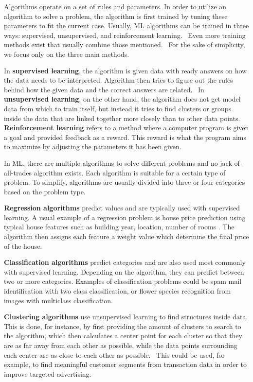 Algorithms operate on a set of rules and parameters.
In order to utilize an algorithm to solve a problem,
the algorithm is first trained by tuning these parameters
to fit the current case.
Usually,
ML algorithms can be trained in three ways:
supervised, unsupervised, and reinforcement learning.~\cite{jordan2015machine}
Even more training methods exist
that usually combine those mentioned.~\cite{ayodele2010types, mahesh2020machine}
For the sake of simplicity,
we focus only on the three main methods.

In \textbf{supervised learning},
the algorithm is given data with ready answers on
how the data needs to be interpreted.
Algorithm then tries to figure out the rules behind
how the given data and the correct answers are related.~\cite{ayodele2010types}
In \textbf{unsupervised learning},
on the other hand,
the algorithm does not get model data from which to train itself,
but instead it tries to find clusters or groups inside the data
that are linked together more closely than to other data points.~\cite{winky}
\textbf{Reinforcement learning} refers to a method
where a computer program is given a goal
and provided feedback as a reward.
This reward is what the program aims to maximize
by adjusting the parameters it has been given.~\cite{ayodele2010types}

In ML,
there are multiple algorithms to solve different problems
and no jack-of-all-trades algorithm exists.
Each algorithm is suitable for a certain type of problem.
To simplify,
algorithms are usually divided into three or four categories
based on the problem type.~\cite{vickery2019mltypes}

\textbf{Regression algorithms} predict values
and are typically used with supervised learning.
A usual example of a regression problem
is house price prediction
using typical house features
such as building
year, location, number of rooms \etc.
The algorithm then assigns each feature a weight value
which determine the final price of the house.~\cite{vickery2019mltypes}

\textbf{Classification algorithms} predict categories
and are also used most commonly with supervised learning.
Depending on the algorithm,
they can predict between two or more categories.
Examples of classification problems
could be spam mail identification with two class classification,
or flower species recognition from images with multiclass classification.~\cite{vickery2019mltypes}

\textbf{Clustering algorithms} use unsupervised learning
to find structures inside data.
This is done,
for instance,
by first providing the amount of clusters to search to the algorithm,
which then calculates a center point for each cluster
so that they are as far away from each other as possible,
while the data points surrounding each center are as close to each other as possible.~\cite{mahesh2020machine}
This could be used,
for example,
to find meaningful customer segments from transaction data
in order to improve targeted advertising.~\cite{chen2017purtreeclust}

